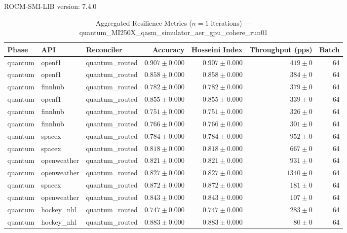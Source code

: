 ROCM-SMI-LIB version: 7.4.0

\begin{table}[htbp]
\caption{Aggregated Resilience Metrics ($n=1$ iterations) --- quantum_MI250X_qasm_simulator_aer_gpu_cohere_run01}
\begin{tabular}{l l l r r r r}
\hline
Phase & API & Reconciler & Accuracy & Hosseini Index & Throughput (pps) & Batch \\
\hline
quantum & openf1 & quantum\_routed & $0.907\pm0.000$ & $0.907\pm0.000$ & $419\pm0$ & 64 \\
quantum & openf1 & quantum\_routed & $0.858\pm0.000$ & $0.858\pm0.000$ & $384\pm0$ & 64 \\
quantum & finnhub & quantum\_routed & $0.782\pm0.000$ & $0.782\pm0.000$ & $379\pm0$ & 64 \\
quantum & openf1 & quantum\_routed & $0.855\pm0.000$ & $0.855\pm0.000$ & $339\pm0$ & 64 \\
quantum & finnhub & quantum\_routed & $0.751\pm0.000$ & $0.751\pm0.000$ & $326\pm0$ & 64 \\
quantum & finnhub & quantum\_routed & $0.766\pm0.000$ & $0.766\pm0.000$ & $301\pm0$ & 64 \\
quantum & spacex & quantum\_routed & $0.784\pm0.000$ & $0.784\pm0.000$ & $952\pm0$ & 64 \\
quantum & spacex & quantum\_routed & $0.818\pm0.000$ & $0.818\pm0.000$ & $667\pm0$ & 64 \\
quantum & openweather & quantum\_routed & $0.821\pm0.000$ & $0.821\pm0.000$ & $931\pm0$ & 64 \\
quantum & openweather & quantum\_routed & $0.827\pm0.000$ & $0.827\pm0.000$ & $1340\pm0$ & 64 \\
quantum & spacex & quantum\_routed & $0.872\pm0.000$ & $0.872\pm0.000$ & $181\pm0$ & 64 \\
quantum & openweather & quantum\_routed & $0.843\pm0.000$ & $0.843\pm0.000$ & $107\pm0$ & 64 \\
quantum & hockey\_nhl & quantum\_routed & $0.747\pm0.000$ & $0.747\pm0.000$ & $283\pm0$ & 64 \\
quantum & hockey\_nhl & quantum\_routed & $0.883\pm0.000$ & $0.883\pm0.000$ & $80\pm0$ & 64 \\

\end{tabular}
\end{table}
